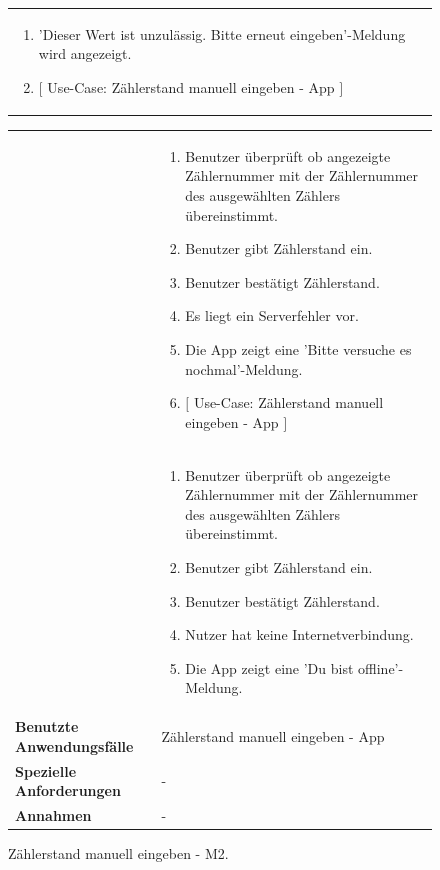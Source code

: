 \begin{figure}[h]
\begin{tabularx}{\textwidth}{ X | X }
\begin{enumerate}
			\item 'Dieser Wert ist unzulässig. Bitte erneut eingeben'-Meldung wird angezeigt. 
 			\item $\lbrack$ Use-Case: Zählerstand manuell eingeben - App $\rbrack$
		\end{enumerate} \\


	\end{tabularx}
\end{figure}

\begin{figure}[h]
	\centering
	\begin{tabularx}{\textwidth}{ X | X }
	&
		\begin{enumerate}
			\item Benutzer überprüft ob angezeigte Zählernummer mit der Zählernummer des ausgewählten Zählers übereinstimmt.
			\item Benutzer gibt Zählerstand ein.
			\item Benutzer bestätigt Zählerstand.
			\item Es liegt ein Serverfehler vor.
			\item Die App zeigt eine 'Bitte versuche es nochmal'-Meldung. 
			\item $\lbrack$ Use-Case: Zählerstand manuell eingeben - App $\rbrack$
		\end{enumerate} \\  &
		\begin{enumerate}
			\item Benutzer überprüft ob angezeigte Zählernummer mit der Zählernummer des ausgewählten Zählers übereinstimmt.
			\item Benutzer gibt Zählerstand ein.
			\item Benutzer bestätigt Zählerstand.
			\item Nutzer hat keine Internetverbindung.
			\item Die App zeigt eine 'Du bist offline'-Meldung.
		\end{enumerate}  \\ \hline
		\textbf{Benutzte Anwendungsfälle} & Zählerstand manuell eingeben - App \\ \hline
		\textbf{Spezielle Anforderungen} & - \\ \hline
		\textbf{Annahmen} & -
	\end{tabularx}
	\caption{Zählerstand manuell eingeben - M2.}
	\label{fig:anwendungsfall-server-tabelle-xx-1}
\end{figure}


